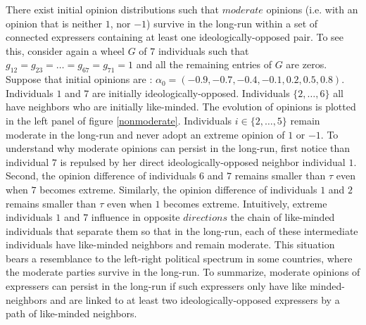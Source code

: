\documentclass{article}
\begin{document}
There exist initial opinion distributions such that $moderate$ opinions (i.e. with an opinion that is neither $1$, nor $-1$)  survive in the long-run within a set of connected expressers containing at least one ideologically-opposed pair. To see this, consider again a wheel $G$ of $7$ individuals such that $g_{12} = g_{23} = \ldots = g_{67}= g_{71}=1$ and all the remaining entries of $G$ are zeros. Suppose that initial opinions are : $\alpha_{0}=(-0.9,-0.7,-0.4,-0.1,0.2,0.5,0.8)$. Individuals $1$ and $7$ are initially ideologically-opposed.  Individuals $\{2, \ldots, 6\}$ all have neighbors who are initially like-minded. The evolution of opinions is plotted in the left panel of figure \ref{nonmoderate}. Individuals $i \in \{2, \ldots, 5\}$ remain moderate in the long-run and never adopt an extreme opinion of $1$ or $-1$.  To understand why moderate opinions can persist in the long-run, first notice than individual $7$ is repulsed by her direct ideologically-opposed neighbor individual $1$. Second, the opinion difference of individuals $6$ and $7$ remains smaller than $\tau$ even when $7$ becomes extreme. Similarly, the opinion difference of individuals $1$ and $2$ remains smaller than $\tau$ even when $1$ becomes extreme.  Intuitively, extreme individuals $1$ and $7$ influence in opposite $directions$ the chain of like-minded individuals that separate them so that in the long-run, each of these intermediate individuals have like-minded neighbors and remain moderate. This situation bears a resemblance to the left-right political spectrum in some countries, where the moderate parties survive in the long-run. To summarize, moderate opinions of expressers can persist in the long-run if such expressers only have like minded-neighbors and are linked to at least two ideologically-opposed expressers by a path of like-minded neighbors. 
\end{document}

